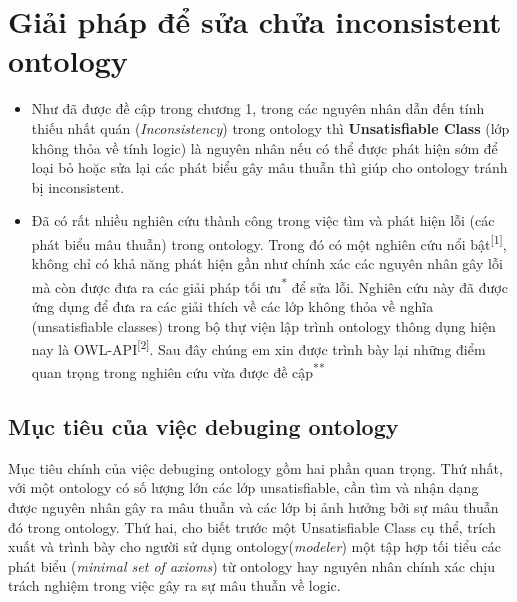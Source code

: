 \chapter{Giải pháp để sửa chửa inconsistent ontology}
{\let\thefootnote\relax{}
\let\thefootnote\relax{}
}
\begin{itemize}
\item
Như đã được đề cập trong chương 1, trong các nguyên nhân dẫn đến tính thiếu nhất quán (\textit{Inconsistency}) trong ontology thì \textbf{Unsatisfiable Class} (lớp không thỏa về tính logic) là nguyên nhân nếu có thể được phát hiện sớm để loại bỏ hoặc sửa lại các phát biểu gây mâu thuẫn thì giúp cho ontology tránh bị inconsistent.
\item
Đã có rất nhiều nghiên cứu thành công trong việc tìm và phát hiện lỗi (các phát biểu mâu thuẫn) trong ontology. Trong đó có một nghiên cứu nổi bật\textsuperscript{[1]}, không chỉ có khả năng phát hiện gần như chính xác các nguyên nhân gây lỗi mà còn được đưa ra các giải pháp tối ưu\textsuperscript{*} để sửa lỗi. Nghiên cứu này đã được ứng dụng để đưa ra các giải thích về các lớp không thỏa về nghĩa (unsatisfiable classes) trong bộ thự viện lập trình ontology thông dụng hiện nay là OWL-API\textsuperscript{[2]}. Sau đây chúng em xin được trình bày lại những điểm quan trọng trong nghiên cứu vừa được đề cập\textsuperscript{**}
\end{itemize}
\clearpage

\section{Mục tiêu của việc debuging ontology}
Mục tiêu chính của việc debuging ontology gồm hai phần quan trọng. Thứ nhất, với một ontology có số lượng lớn các lớp unsatisfiable, cần tìm và nhận dạng được nguyên nhân gây ra mâu thuẫn và các lớp bị ảnh hưởng bởi sự mâu thuẫn đó trong ontology. Thứ hai, cho biết trước một Unsatisfiable Class cụ thể, trích xuất và trình bày cho người sử dụng ontology(\textit{modeler}) một tập hợp tối tiểu các phát biểu (\textit{minimal set of axioms}) từ ontology hay nguyên nhân chính xác chịu trách nghiệm trong việc gây ra sự mâu thuẫn về logic.
\\
